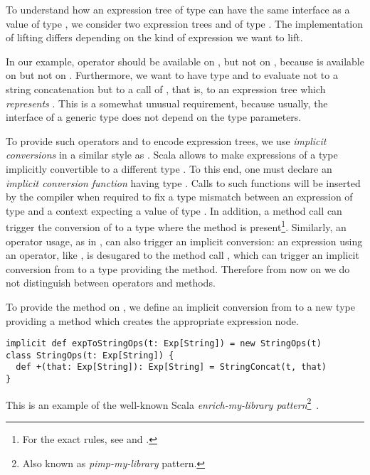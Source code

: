 To understand how an expression tree of type  can have the same interface as a value of type , we consider two expression trees  and  of type . The implementation of lifting differs depending on the kind of expression we want to lift.

In our example, operator \code{+} should be available on , but not on , because \code{+} is available on  but not on .
Furthermore, we want  to have type  and to evaluate not to a string concatenation but to a call of , that is, to an expression tree which \emph{represents} . This is a somewhat unusual requirement, because usually, the interface of a generic type does not depend on the type parameters.

To provide such operators and to encode expression trees, we use \emph{implicit conversions} in a similar style as \citet{rompf2010lightweight}. Scala allows to make expressions of a type  implicitly convertible to a different type . To this end, one must declare an \emph{implicit conversion function} having type . Calls to such functions will be inserted by the compiler when required to fix a type mismatch between an expression of type  and a context expecting a value of type . In addition, a method call  can trigger the conversion of  to a type where the method  is present\footnote{For the exact rules, see \citet[Ch.~21]{Odersky11book} and \citet{ScalaRef}.}. Similarly, an operator usage, as in , can also trigger an implicit conversion: an expression using an operator, like , is desugared to the method call , which can trigger an implicit conversion from  to a type providing the \code{+} method. Therefore from now on we do not distinguish between operators and methods.

To provide the method \code{+} on , we define an implicit conversion from  to a new type providing a \code{+} method which creates the appropriate expression node.
\begin{lstlisting}
implicit def expToStringOps(t: Exp[String]) = new StringOps(t)
class StringOps(t: Exp[String]) {
  def +(that: Exp[String]): Exp[String] = StringConcat(t, that)
}
\end{lstlisting}
This is an example of the well-known Scala \emph{enrich-my-library pattern}\footnote{Also known as \emph{pimp-my-library} pattern.}~\citep{OderskyPimpLib}.

